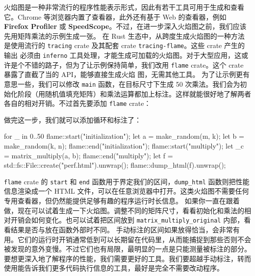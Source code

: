火焰图是一种非常流行的程序性能表示形式，因此有若干工具可用于生成和查看它。Chrome 等浏览器内置了查看器，此外还有基于 Web 的查看器，例如 \textbf{Firefox Profiler} 或 \textbf{SpeedScope}。不过，在进一步深入火焰图之前，我们应该先用矩阵乘法的示例生成一张。
在 Rust 生态中，从跨度生成火焰图的一种方法是使用流行的
\texttt{tracing} crate 及其配套 crate \texttt{tracing-\allowbreak{}flame}。这些 crate 产生的输出
必须由 \texttt{inferno} 工具处理，才能生成可加载的火焰图。对于大型应用，这或许是个不错的路子，但为了让示例保持简单，我们改用
\texttt{flame} crate。这个 crate 暴露了直截了当的 API，能够直接生成火焰
图，无需其他工具。
\label{idx:idx_73e981c2}
为了让示例更有意思一些，我们可以修改 \texttt{main} 函数，在目标尺寸下生成 50 次乘法。我们会为初始化阶段（用随机值填充矩阵）和乘法运算都加上标注。这样就能很好地了解两者各自的相对开销。不过首先要添加 \texttt{flame} crate：
做完这一步，我们就可以添加循环和标注了：
\begin{codebox}[rust]
for _ in 0..50 {
     flame::start("initialization");
     let a = make_random(m, k);
     let b = make_random(k, n);
     flame::end("initialization");
     flame::start("multiply");
     let _c = matrix_multiply(a, b);
     flame::end("multiply");
 }
 let f = std::fs::File::create("perf.html").unwrap();
 flame::dump_html(f).unwrap();
\end{codebox}
\texttt{flame} crate 的 \texttt{start} 和 \texttt{end} 函数用于界定我们的区间，\texttt{dump\_html} 函数则把性能信息渲染成一个 HTML 文件，可以在任意浏览器中打开。这类火焰图不需要任何专用查看器，但仍然能提供足够有趣的程序运行时长信息。
如果你一直在跟着做，现在可以试着生成一下火焰图。调整不同的矩阵尺寸，看看初始化和乘法的相对开销会如何变化。也可以试着把区间放到 \texttt{matrix\_\allowbreak{}multiply\_\allowbreak{}original} 内部，看看结果是否与放在函数外部时不同。
手动标注的区间如果放得恰当，会非常有用。它们的运行时开销通常低到可以长期留在代码里，从而能捕捉到那些否则不会被发现的意外变慢。不过它们也有局限，最明显的一点是只能测量被标注的部分。
\label{idx:idx_b3f7859f}
要想更深入地了解程序的性能，我们需要更好的工具。我们要超越手动标注，转而使用能告诉我们更多代码执行信息的工具，最好是完全不需要改动程序。
